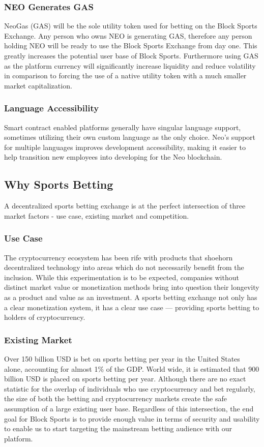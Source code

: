 \documentclass{article}
\begin{document}
		\subsubsection{NEO Generates GAS}
NeoGas (GAS) will be the sole utility token used for betting on the Block Sports Exchange. Any person who owns NEO is generating GAS, therefore any person holding NEO will be ready to use the Block Sports Exchange from day one. This greatly increases the potential user base of Block Sports. Furthermore using GAS as the platform currency will significantly increase liquidity and reduce volatility in comparison to forcing the use of a native utility token with a much smaller market capitalization.

		\subsubsection{Language Accessibility}
Smart contract enabled platforms generally have singular language support, sometimes utilizing their own custom language as the only choice. Neo’s support for multiple languages improves development accessibility, making it easier to help transition new employees into developing for the Neo blockchain.

	\subsection{Why Sports Betting}
A decentralized sports betting exchange is at the perfect intersection of three market factors - use case, existing market and competition. 

		\subsubsection{Use Case}
The cryptocurrency ecosystem has been rife with products that shoehorn decentralized technology into areas which do not necessarily benefit from the inclusion. While this experimentation is to be expected, companies without distinct market value or monetization methods bring into question their longevity as a product and value as an investment. A sports betting exchange not only has a clear monetization system, it has a clear use case --- providing sports betting to holders of cryptocurrency.

		
		\subsubsection{Existing Market}
Over 150 billion USD is bet on sports betting per year in the United States alone, accounting for almost 1\% of the GDP. World wide, it is estimated that 900 billion USD is placed on sports betting per year. Although there are no exact statistic for the overlap of individuals who use cryptocurrency and bet regularly, the size of both the betting and cryptocurrency markets create the safe assumption of a large existing user base. Regardless of this intersection, the end goal for Block Sports is to provide enough value in terms of security and usability to enable us to start targeting the mainstream betting audience with our platform. 
\end{document}
